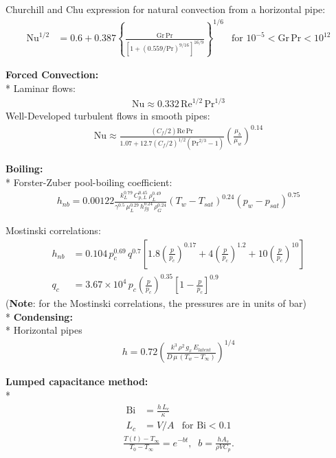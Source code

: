 \begin{datasheet}
Churchill and Chu expression for natural convection from a
horizontal pipe:
\begin{align*}
  \text{Nu}^{1/2} &= 0.6 + 0.387
  \left\{\frac{\text{Gr}\,\text{Pr}}{\left[1 + \left(0.559 /
          \text{Pr}\right)^{9/16}\right]^{16/9}}\right\}^{1/6} &
  \text{for $10^{-5}<\text{Gr}\,\text{Pr}<10^{12}$}
\end{align*}%

{\bf Forced Convection:}\\*
Laminar flows:
\begin{align*}
  \text{Nu} \approx 0.332\,\text{Re}^{1/2}\,\text{Pr}^{1/3}
\end{align*}
Well-Developed turbulent flows in smooth pipes:
\begin{align*}
  \text{Nu} \approx \frac{(C_f/2)
    \text{Re}\,\text{Pr}}{1.07+12.7(C_f/2)^{1/2}\left(\text{Pr}^{2/3}
      -1\right)}\left(\frac{\mu_b}{\mu_w}\right)^{0.14}
\end{align*}

{\bf Boiling:}\\*
Forster-Zuber pool-boiling coefficient:
\begin{align*}
  h_{nb}=0.00122\frac{k_L^{0.79}\, C_{p,L}^{0.45}\, \rho_L^{0.49}}{\gamma^{0.5}\,\mu_L^{0.29}\,h_{fg}^{0.24}\,\rho_G^{0.24}}\left(T_w - T_{sat}\right)^{0.24}\left(p_w-p_{sat}\right)^{0.75}
\end{align*}

Mostinski correlations: 
\begin{align*}
  h_{nb} &= 0.104\,p_c^{0.69}\,q^{0.7}\left[1.8\left(\frac{p}{p_c}\right)^{0.17}+4\left(\frac{p}{p_c}\right)^{1.2}+10\left(\frac{p}{p_c}\right)^{10}\right]\\
  q_c &=
  3.67\times10^4\,p_c\left(\frac{p}{p_c}\right)^{0.35}\left[1-\frac{p}{p_c}\right]^{0.9}
\end{align*}
({\bf Note}: for the Mostinski correlations, the pressures are in units of bar)\\*
{\bf Condensing:}\\*
Horizontal pipes
\begin{align*}
  h = 0.72
  \left(\frac{k^3\,\rho^2\,g_x\,E_{latent}}{D\,\mu\,\left(T_w-T_\infty\right)}\right)^{1/4}
\end{align*}

{\bf Lumped capacitance method:}\\*
\begin{align*}
  \text{Bi} &= \frac{h\,L_c}{\kappa} & \\
  L_c &= 
  V/A & \text{for $\text{Bi}<0.1$}
\end{align*}
\begin{align*}
    \frac{T(t)-T_{\infty}}{T_{0}-T_{\infty}} = e^{-bt},\;\;b = \frac{hA_{s}}{\rho V C_{p}}.
\end{align*}


\end{datasheet}
